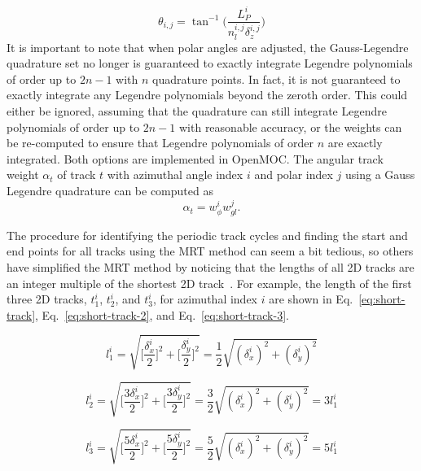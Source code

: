 \begin{equation}
\theta_{i,j} = \tan^{-1} \bigg( \frac{L_P^i}{n_l^{i,j} \delta_z^{i,j}}\bigg)
\label{eq:MRT-theta-correct}
\end{equation}
It is important to note that when polar angles are adjusted, the Gauss-Legendre quadrature set no longer is guaranteed to exactly integrate Legendre polynomials of order up to $2n-1$ with $n$ quadrature points. In fact, it is not guaranteed to exactly integrate any Legendre polynomials beyond the zeroth order. This could either be ignored, assuming that the quadrature can still integrate Legendre polynomials of order up to $2n-1$ with reasonable accuracy, or the weights can be re-computed to ensure that Legendre polynomials of order $n$ are exactly integrated. Both options are implemented in OpenMOC. The angular track weight $\alpha_t$ of track $t$ with azimuthal angle index $i$ and polar index $j$ using a Gauss Legendre quadrature can be computed as
\begin{equation}
\alpha_t = w_{\phi}^i w_{\textit{gl}}^j .
\end{equation}

The procedure for identifying the periodic track cycles and finding the start and end points for all tracks using the \ac{MRT} method can seem a bit tedious, so others have simplified the \ac{MRT} method by noticing that the lengths of all 2D tracks are an integer multiple of the shortest 2D track~\cite{kochunas}. For example, the length of the first three 2D tracks, $t_1^i$, $t_2^i$, and $t_3^i$, for azimuthal index $i$ are shown in Eq.~\ref{eq:short-track}, Eq.~\ref{eq:short-track-2}, and Eq.~\ref{eq:short-track-3}.

\begin{equation}
l_1^i = \sqrt{\bigg[\frac{\delta_x^i}{2}\bigg]^2 + \bigg[\frac{\delta_y^i}{2}\bigg]^2} = \frac{1}{2} \sqrt{(\delta_x^i)^2 + (\delta_y^i)^2}
\label{eq:short-track}
\end{equation}

\begin{equation}
l_2^i = \sqrt{\bigg[\frac{3 \delta_x^i}{2}\bigg]^2 + \bigg[\frac{3 \delta_y^i}{2}\bigg]^2} = \frac{3}{2} \sqrt{(\delta_x^i)^2 + (\delta_y^i)^2} = 3 l_1^i
\label{eq:short-track-2}
\end{equation}

\begin{equation}
l_3^i = \sqrt{\bigg[\frac{5 \delta_x^i}{2}\bigg]^2 + \bigg[\frac{5 \delta_y^i}{2}\bigg]^2} = \frac{5}{2} \sqrt{(\delta_x^i)^2 + (\delta_y^i)^2} = 5 l_1^i
\label{eq:short-track-3}
\end{equation}

